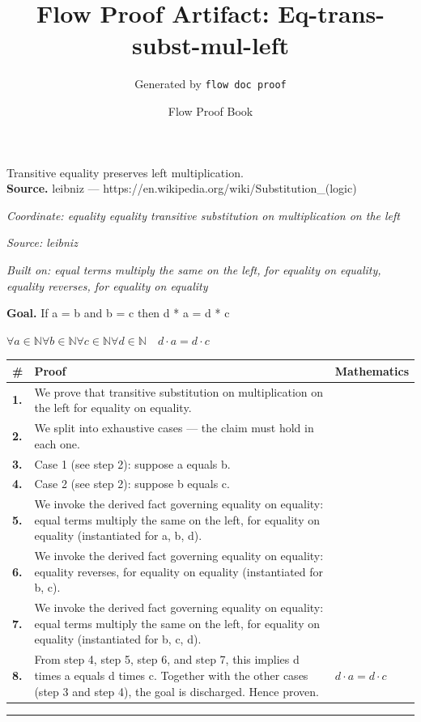 \documentclass[11pt]{article}
\title{Flow Proof Artifact: Eq-trans-subst-mul-left}
\author{Generated by \texttt{flow doc proof}}
\date{Flow Proof Book}
\theoremstyle{definition}
\begin{document}
\maketitle
Transitive equality preserves left multiplication.\\[0.5em]
\textbf{Source.} leibniz — https://en.wikipedia.org/wiki/Substitution\_(logic)\\[0.5em]
\bigskip
{}\par
\smallskip\noindent\textit{Coordinate: equality \cdot equality \cdot transitive substitution on multiplication on the left}\par
\smallskip\noindent\textit{Source: leibniz}\par
\smallskip\noindent\textit{Built on: equal terms multiply the same on the left, for equality on equality, equality reverses, for equality on equality}\par
\medskip
\noindent\textbf{Goal.} If a = b and b = c then d * a = d * c\par
\noindent$\displaystyle \forall a \in \mathbb{N} \forall b \in \mathbb{N} \forall c \in \mathbb{N} \forall d \in \mathbb{N}\quad d \cdot a = d \cdot c$\par
\medskip
\noindent
\begin{tabular}{@{} >{\raggedright\arraybackslash}p{} >{\raggedright\arraybackslash}p{} >{\raggedleft\arraybackslash}p{} @{}}
\textbf{\#} & \textbf{Proof} & \textbf{Mathematics} \\
\midrule
\textbf{1.} & We prove that transitive substitution on multiplication on the left for equality on equality. & \\[0.45em]
\textbf{2.} & We split into exhaustive cases — the claim must hold in each one. & \\[0.45em]
\textbf{3.} & Case 1 (see step 2): suppose a  equals  b. & \\[0.45em]
\textbf{4.} & Case 2 (see step 2): suppose b  equals  c. & \\[0.45em]
\textbf{5.} & We invoke the derived fact governing equality on equality: equal terms multiply the same on the left, for equality on equality (instantiated for a, b, d). & \\[0.45em]
\textbf{6.} & We invoke the derived fact governing equality on equality: equality reverses, for equality on equality (instantiated for b, c). & \\[0.45em]
\textbf{7.} & We invoke the derived fact governing equality on equality: equal terms multiply the same on the left, for equality on equality (instantiated for b, c, d). & \\[0.45em]
\textbf{8.} & From step 4, step 5, step 6, and step 7, this implies d times a equals d times c. Together with the other cases (step 3 and step 4), the goal is discharged. Hence proven. & $\displaystyle d \cdot a = d \cdot c$ \\[0.45em]
\bottomrule
\end{tabular}
\label{thm:Eq-equality-transitive_substitution_on_multiplication_on_the_left}
\par\medskip\hrule
\end{document}
